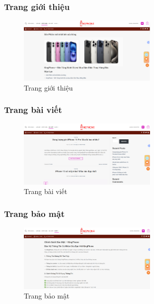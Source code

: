 \subsubsection{Trang giới thiệu}
\begin{figure}[H]
    \centering
    \includegraphics[width=0.6\textwidth]{img/gioithieu.png}
    \caption{Trang giới thiệu}
    \label{fig:gt}
\end{figure}

\subsubsection{Trang bài viết}
\begin{figure}[H]
    \centering
    \includegraphics[width=0.6\textwidth]{img/baiviet.png}
    \caption{Trang bài viết}
    \label{fig:baiviet}
\end{figure}

\subsubsection{Trang bảo mật}
\begin{figure}[H]
    \centering
    \includegraphics[width=0.6\textwidth]{img/baomat.png}
    \caption{Trang bảo mật}
    \label{fig:bmat}
\end{figure}

